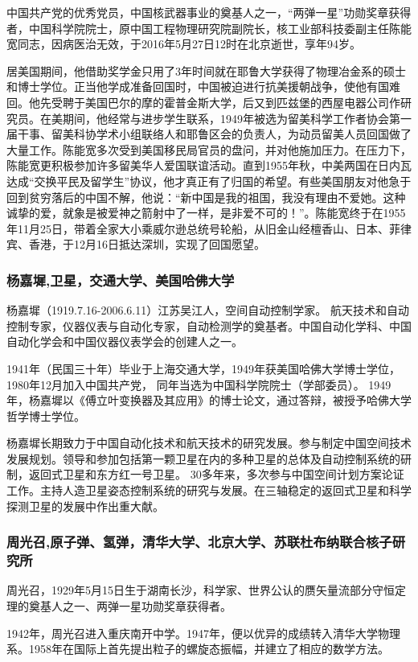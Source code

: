 \documentclass[UTF8]{ctexart}
\begin{document}
中国共产党的优秀党员，中国核武器事业的奠基人之一，“两弹一星”功勋奖章获得者，中国科学院院士，原中国工程物理研究院副院长，核工业部科技委副主任陈能宽同志，因病医治无效，于2016年5月27日12时在北京逝世，享年94岁。

居美国期间，他借助奖学金只用了3年时间就在耶鲁大学获得了物理冶金系的硕士和博士学位。正当他学成准备回国时，中国被迫进行抗美援朝战争，使他有国难回。他先受聘于美国巴尔的摩的霍普金斯大学，后又到匹兹堡的西屋电器公司作研究员。在美期间，他经常与进步学生联系，1949年被选为留美科学工作者协会第一届干事、留美科协学术小组联络人和耶鲁区会的负责人，为动员留美人员回国做了大量工作。陈能宽多次受到美国移民局官员的盘问，并对他施加压力。在压力下，陈能宽更积极参加许多留美华人爱国联谊活动。直到1955年秋，中美两国在日内瓦达成“交换平民及留学生”协议，他才真正有了归国的希望。有些美国朋友对他急于回到贫穷落后的中国不解，他说：“新中国是我的祖国，我没有理由不爱她。这种诚挚的爱，就象是被爱神之箭射中了一样，是非爱不可的！”。陈能宽终于在1955年11月25日，带着全家大小乘威尔逊总统号轮船，从旧金山经檀香山、日本、菲律宾、香港，于12月16日抵达深圳，实现了回国愿望。

    \subsubsection{杨嘉墀,卫星，交通大学、美国哈佛大学}
杨嘉墀（1919.7.16-2006.6.11）江苏吴江人，空间自动控制学家。 航天技术和自动控制专家，仪器仪表与自动化专家，自动检测学的奠基者。中国自动化学科、中国自动化学会和中国仪器仪表学会的创建人之一。

1941年（民国三十年）毕业于上海交通大学，1949年获美国哈佛大学博士学位， 1980年12月加入中国共产党， 同年当选为中国科学院院士（学部委员）。 1949年，杨嘉墀以《傅立叶变换器及其应用》的博士论文，通过答辩，被授予哈佛大学哲学博士学位。

杨嘉墀长期致力于中国自动化技术和航天技术的研究发展。参与制定中国空间技术发展规划。领导和参加包括第一颗卫星在内的多种卫星的总体及自动控制系统的研制，返回式卫星和东方红一号卫星。 30多年来，多次参与中国空间计划方案论证工作。主持人造卫星姿态控制系统的研究与发展。在三轴稳定的返回式卫星和科学探测卫星的发展中作出重大献。

    \subsubsection{周光召,原子弹、氢弹，清华大学、北京大学、苏联杜布纳联合核子研究所}
周光召，1929年5月15日生于湖南长沙，科学家、世界公认的赝矢量流部分守恒定理的奠基人之一、两弹一星功勋奖章获得者。

1942年，周光召进入重庆南开中学。1947年，便以优异的成绩转入清华大学物理系。1958年在国际上首先提出粒子的螺旋态振幅，并建立了相应的数学方法。
\end{document}
